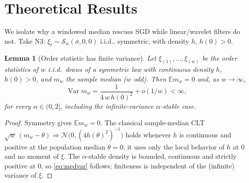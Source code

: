 \documentclass[conference]{IEEEtran}
\newtheorem{lemma}{Lemma}
\newcommand{\E}{\mathbb{E}}
\newcommand{\Sstable}{\mathcal{S}_\alpha}
\DeclareMathOperator{\Var}{Var}
\begin{document}
\section{Theoretical Results}

We isolate why a windowed median rescues SGD while linear/wavelet
filters do not. Take N3: $\xi_t\sim\Sstable(\sigma,0,0)$ i.i.d.,
symmetric, with density $h$, $h(0)>0$.

\begin{lemma}[Order statistic has finite variance]
\label{lem:median}
Let $\xi_{(1)},\dots,\xi_{(w)}$ be the order statistics of $w$ i.i.d.\
draws of a symmetric law with continuous density $h$, $h(0)>0$, and
$m_w$ the sample median ($w$ odd). Then
$\E m_w=0$ and, as $w\to\infty$,
\begin{equation}
\Var m_w=\frac{1}{4\,w\,h(0)^2}+o(1/w)<\infty,
\label{eq:medvar}
\end{equation}
for \emph{every} $\alpha\in(0,2]$, including the infinite-variance
$\alpha$-stable case.
\end{lemma}
\begin{proof}
Symmetry gives $\E m_w=0$. The classical sample-median CLT
$\sqrt{w}\,(m_w-\theta)\Rightarrow\mathcal N\!\big(0,(4h(\theta)^2)^{-1}\big)$
holds whenever $h$ is continuous and positive at the population median
$\theta=0$; it uses only the local behavior of $h$ at $0$ and no
moment of $\xi$. The $\alpha$-stable density is bounded, continuous and
strictly positive at $0$, so \eqref{eq:medvar} follows; finiteness is
independent of the (infinite) variance of $\xi$.
\end{proof}
\end{document}
